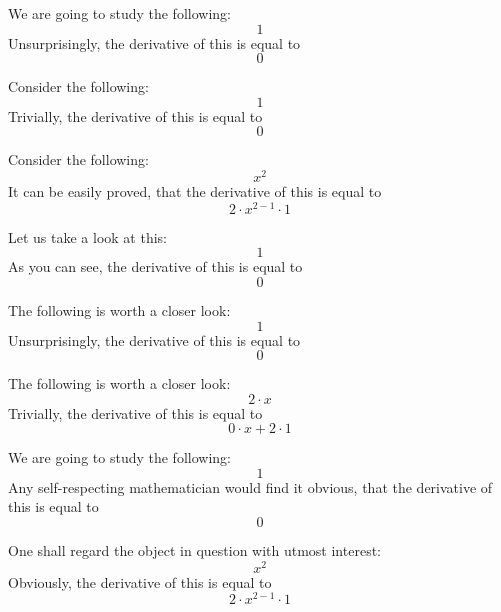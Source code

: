 \documentclass{article}
\begin{document}
We are going to study the following:
\begin{equation}
1 
\end{equation}
Unsurprisingly, the derivative of this is equal to
\begin{equation}
0 
\end{equation}

Consider the following:
\begin{equation}
1 
\end{equation}
Trivially, the derivative of this is equal to
\begin{equation}
0 
\end{equation}

Consider the following:
\begin{equation}
x ^{2 } 
\end{equation}
It can be easily proved, that the derivative of this is equal to
\begin{equation}
2 \cdot x ^{2 - 1 } \cdot 1 
\end{equation}

Let us take a look at this:
\begin{equation}
1 
\end{equation}
As you can see, the derivative of this is equal to
\begin{equation}
0 
\end{equation}

The following is worth a closer look:
\begin{equation}
1 
\end{equation}
Unsurprisingly, the derivative of this is equal to
\begin{equation}
0 
\end{equation}

The following is worth a closer look:
\begin{equation}
2 \cdot x 
\end{equation}
Trivially, the derivative of this is equal to
\begin{equation}
0 \cdot x + 2 \cdot 1 
\end{equation}

We are going to study the following:
\begin{equation}
1 
\end{equation}
Any self-respecting mathematician would find it obvious, that the derivative of this is equal to
\begin{equation}
0 
\end{equation}

One shall regard the object in question with utmost interest:
\begin{equation}
x ^{2 } 
\end{equation}
Obviously, the derivative of this is equal to
\begin{equation}
2 \cdot x ^{2 - 1 } \cdot 1 
\end{equation}
\end{document}

